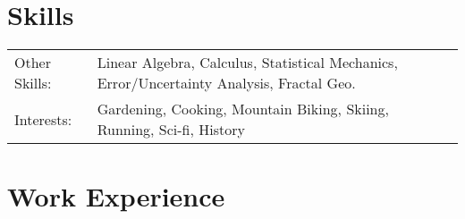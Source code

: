 \documentclass[a4paper,12pt]{article}
\begin{document}
\section{Skills}
\begin{tabularx}{\linewidth}{@{}l X@{}}
Other Skills: &  \normalsize{Linear Algebra, Calculus, Statistical Mechanics, Error/Uncertainty Analysis, Fractal Geo.}\\
Interests:  &  \normalsize{Gardening, Cooking, Mountain Biking, Skiing, Running, Sci-fi, History}\\
\end{tabularx}




\section{Work Experience}
\end{document}
